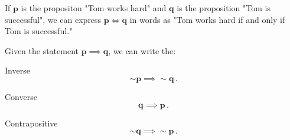 %
%

\begin{subquestions}


\subquestion

If $\boldsymbol{p}$ is the propositon "Tom works hard" and $\boldsymbol{q}$ is the proposition "Tom is successful", we can express $\boldsymbol{p \iff q}$ in words as "Tom works hard if and only if Tom is successful."

	
\subquestion 

Given the statement $\boldsymbol{p \implies q}$, we can write the:
\begin{subsubquestions}
	

\subsubquestion
Inverse
\begin{equation}
	\boldsymbol{\sim p \implies \sim q}\,.
\end{equation}


\subsubquestion
Converse
\begin{equation}
	\boldsymbol{q \implies p}\,.
\end{equation}


\subsubquestion
Contrapositive
\begin{equation}
	\boldsymbol{\sim q \implies \sim p}\,.
\end{equation}


\end{subsubquestions}
\end{subquestions}
